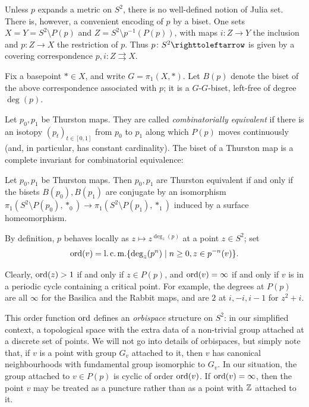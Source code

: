 \documentclass{amsart}
\begin{document}
Unless $p$ expands a metric on $S^2$, there is no well-defined notion
of Julia set. There is, however, a convenient encoding of $p$ by a
biset. One sets $X=Y=S^2\setminus P(p)$ and
$Z=S^2\setminus p^{-1}(P(p))$, with maps $i\colon Z\to Y$ the
inclusion and $p\colon Z\to X$ the restriction of $p$. Thus
$p\colon S^2\selfmap$ is given by a covering correspondence
$p,i\colon Z\rightrightarrows X$.

Fix a basepoint $*\in X$, and write $G=\pi_1(X,*)$. Let $B(p)$ denote
the biset of the above correspondence associated with $p$; it is a
$G$-$G$-biset, left-free of degree $\deg(p)$.

Let $p_0,p_1$ be Thurston maps. They are called \emph{combinatorially
  equivalent} if there is an isotopy $(p_t)_{t\in[0,1]}$ from $p_0$ to
$p_1$ along which $P(p)$ moves continuously (and, in particular, has
constant cardinality). The biset of a Thurston map is a complete
invariant for combinatorial equivalence:
\begin{thm}
\label{thm:Kameyama}
  Let $p_0,p_1$ be Thurston maps. Then $p_0,p_1$ are Thurston
  equivalent if and only if the bisets $B(p_0),B(p_1)$ are conjugate
  by an isomorphism
  $\pi_1(S^2\setminus P(p_0),*_0)\to\pi_1(S^2\setminus P(p_1),*_1)$
  induced by a surface homeomorphism.
\end{thm}

By definition, $p$ behaves locally as $z\mapsto z^{\deg_z(p)}$ at a point
$z\in S^2$; set
\[\operatorname{ord}(v)=\operatorname{l.c.m.}\{\deg_z(p^n)\mid n\ge0,z\in p^{-n}(v)\}.\]

Clearly, $\operatorname{ord}(z)>1$ if and only if $z\in P(p)$, and $\operatorname{ord}(v)=\infty$ if
and only if $v$ is in a periodic cycle containing a critical point. For
example, the degrees at $P(p)$ are all $\infty$ for the Basilica and the
Rabbit maps, and are $2$ at $i,-i,i-1$ for $z^2+i$.

This order function $\operatorname{ord}$ defines an \emph{orbispace} structure on
$S^2$: in our simplified context, a topological space with the extra
data of a non-trivial group attached at a discrete set of points. We
will not go into details of orbispaces, but simply note that, if $v$
is a point with group $G_v$ attached to it, then $v$ has canonical
neighbourhoods with fundamental group isomorphic to $G_v$. In our
situation, the group attached to $v\in P(p)$ is cyclic of order
$\operatorname{ord}(v)$. If $\operatorname{ord}(v)=\infty$, then the point $v$ may be treated as a
puncture rather than as a point with ${\mathbb Z}$ attached to it.
\end{document}
